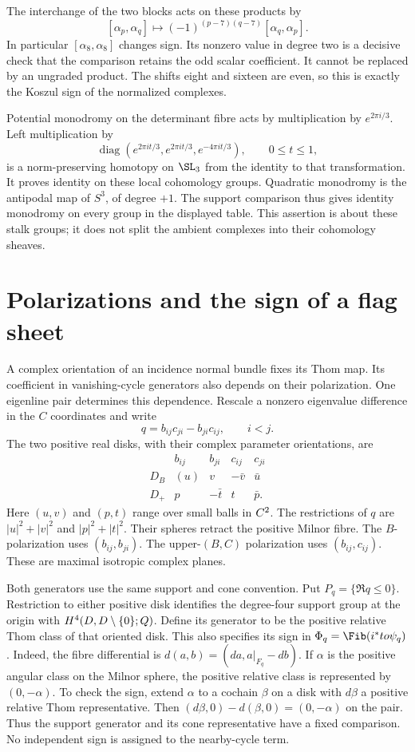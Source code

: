 The interchange of the two blocks acts on these products by
\[
 [\alpha_p,\alpha_q]\longmapsto
       (-1)^{(p-7)(q-7)}[\alpha_q,\alpha_p].
\]
In particular $[\alpha_8,\alpha_8]$ changes sign. Its nonzero value
in degree two is a decisive check that the comparison retains the
odd scalar coefficient. It cannot be replaced by an ungraded product.
The shifts eight and sixteen are even, so this is exactly the
Koszul sign of the normalized complexes.

Potential monodromy on the determinant fibre acts by multiplication
by $e^{2\pi i/3}$. Left multiplication by
\[
 \operatorname{diag}(e^{2\pi it/3},e^{2\pi it/3},e^{-4\pi it/3}),
 \qquad 0\le t\le1,
\]
is a norm-preserving homotopy on $\SL_3$ from the identity to that
transformation. It proves identity on these local cohomology groups.
Quadratic monodromy is the antipodal map of $S^3$, of degree $+1$.
The support comparison thus gives identity monodromy on every group
in the displayed table. This assertion is about these stalk groups;
it does not split the ambient complexes into their cohomology sheaves.

\section{Polarizations and the sign of a flag sheet}
\label{ts22:sec:normalization}

A complex orientation of an incidence normal bundle fixes its Thom map.
Its coefficient in vanishing-cycle generators also depends on their
polarization. One eigenline pair determines this dependence.
Rescale a nonzero eigenvalue difference in the $C$ coordinates and write
\[
 q=b_{ij}c_{ji}-b_{ji}c_{ij},\qquad i<j.
\]
The two positive real disks, with their complex parameter orientations, are
\[
\begin{array}{c|cccc}
 &b_{ij}&b_{ji}&c_{ij}&c_{ji}\\ \hline
 D_B&(u)&v&-\bar v&\bar u\\
 D_+&p&-\bar t&t&\bar p.
\end{array}
\]
Here $(u,v)$ and $(p,t)$ range over small balls in $C^2$.
The restrictions of $q$ are $|u|^2+|v|^2$ and $|p|^2+|t|^2$.
Their spheres retract the positive Milnor fibre. The $B$-polarization
uses $(b_{ij},b_{ji})$. The upper-$(B,C)$ polarization uses
$(b_{ij},c_{ij})$. These are maximal isotropic complex planes.

Both generators use the same support and cone convention.
Put $P_q=\{\Re q\le0\}$. Restriction to either positive disk
identifies the degree-four support group at the origin with
$H^4(D,D\setminus\{0\};Q)$. Define its generator to be the
positive relative Thom class of that oriented disk.
This also specifies its sign in $\Phi_q=\Fib(i^*\to\psi_q)$.
Indeed, the fibre differential is
$d(a,b)=(da,a|_{F_q}-db)$.
If $\alpha$ is the positive angular class on the Milnor sphere,
the positive relative class is represented by $(0,-\alpha)$.
To check the sign, extend $\alpha$ to a cochain $\beta$ on a disk
with $d\beta$ a positive relative Thom representative.
Then $(d\beta,0)-d(\beta,0)=(0,-\alpha)$ on the pair.
Thus the support generator and its cone representative have a fixed
comparison. No independent sign is assigned to the nearby-cycle term.

